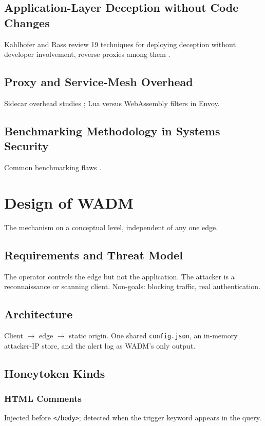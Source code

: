 \documentclass{rptuma}
\begin{document}
\section{Application-Layer Deception without Code Changes}
Kahlhofer and Rass review 19 techniques for deploying deception without developer involvement,
reverse proxies among them \cite{kahlhofer2024application}.

\section{Proxy and Service-Mesh Overhead}
Sidecar overhead studies \cite{zhu2022dissecting}; Lua versus WebAssembly filters in Envoy.

\section{Benchmarking Methodology in Systems Security}
Common benchmarking flaws \cite{vanderkouwe2019sok,heiser_crimes}.

\chapter{Design of WADM}
The mechanism on a conceptual level, independent of any one edge.

\section{Requirements and Threat Model}
The operator controls the edge but not the application. The attacker is a reconnaissance or
scanning client. Non-goals: blocking traffic, real authentication.

\section{Architecture}
Client $\rightarrow$ edge $\rightarrow$ static origin. One shared \texttt{config.json}, an
in-memory attacker-IP store, and the alert log as WADM's only output.

\section{Honeytoken Kinds}
\subsection{HTML Comments}
Injected before \texttt{</body>}; detected when the trigger keyword appears in the query.
\end{document}
